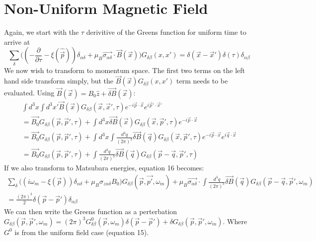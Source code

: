 \documentclass{article}
\begin{document}
\section*{\bf{Non-Uniform Magnetic Field}}

Again, we start with the $\tau$ derivitive of the Greens function for uniform time to arrive at
\begin{equation}
\sum\limits_\delta\big((-\frac{\partial}{\partial\tau}-\xi(\hat{\vec{p}}))\delta_{\alpha\delta}+\mu_B\vec{\sigma_{\alpha\delta}}\cdot\vec{B}(\vec{x})\big)G_{\delta\beta}(x,x')=\delta(\vec{x}-\vec{x}')\delta(\tau)\delta_{\alpha\beta}
\end{equation}
We now wish to transform to momentum space. 
The first two terms on the left hand side transform simply, but the $\vec{B}(\vec{x})G_{\delta\beta}(x,x')$ term needs to be evaluated. Using $\vec{B}(\vec{x})=B_0\hat{z}+\vec{\delta B}(\vec{x})$:
\begin{align*}
\int d^3x\int d^3x'\vec{B}(\vec{x})G_{\delta\beta}(\vec{x},\vec{x}',\tau)e^{-i\vec{p}\cdot\vec{x}}e^{i\vec{p}'\cdot\vec{x}'} \\=\vec{B_0}G_{\delta\beta}(\vec{p},\vec{p}',\tau)+\int d^3x\vec{\delta B}(\vec{x})G_{\delta\beta}(\vec{x},\vec{p}',\tau)e^{-i\vec{p}\cdot\vec{x}}
\\=\vec{B_0}G_{\delta\beta}(\vec{p},\vec{p}',\tau)+\int d^3x\int \frac{d^3q}{(2\pi)^3}\vec{\delta B}(\vec{q})G_{\delta\beta}(\vec{x},\vec{p}',\tau)e^{-i\vec{p}\cdot\vec{x}}e^{i\vec{q}\cdot\vec{x}} \\=\vec{B_0}G_{\delta\beta}(\vec{p},\vec{p}',\tau)+\int \frac{d^3q}{(2\pi)^3}\vec{\delta B}(\vec{q})G_{\delta\beta}(\vec{p}-\vec{q},\vec{p}',\tau)
\end{align*}
If we also transform to Matsubara energies, equation 16 becomes:
\begin{align*}
\sum\limits_\delta\big((i\omega_m-\xi(\vec{p}))\delta_{\alpha\delta}+\mu_B\sigma_{z\alpha\delta}B_0\big)G_{\delta\beta}(\vec{p},\vec{p'},\omega_m)+\mu_B\vec{\sigma_{\alpha\delta}}\cdot\int \frac{d^3q}{(2\pi)^3}\vec{\delta B}(\vec{q})G_{\delta\beta}(\vec{p}-\vec{q},\vec{p}',\omega_m) \\ =\frac{(2\pi)^3}{2}\delta(\vec{p}-\vec{p}')\delta_{\alpha\beta}
\end{align*}
We can then write the Greens function as a perterbation $G_{\delta\beta}(\vec{p},\vec{p}',\omega_m)=(2\pi)^3G^0_{\delta\beta}(\vec{p},\omega_m)\delta(\vec{p}-\vec{p}')+\delta G_{\delta\beta}(\vec{p},\vec{p}',\omega_m)$. Where $G^0$ is from the uniform field case (equation 15).
\end{document}
